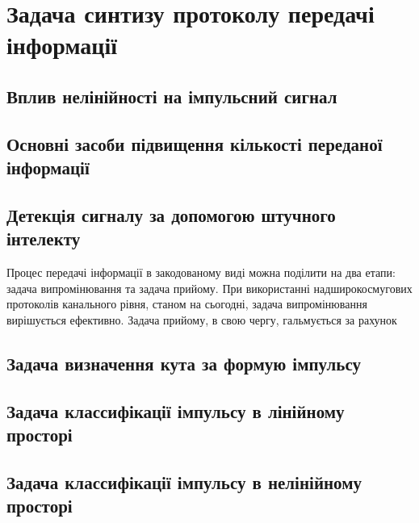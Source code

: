 \chapter{Задача синтизу протоколу передачі інформації}
\label{ch:neuron}

\section{Вплив нелінійності на імпульсний сигнал}

\section{Основні засоби підвищення кількості переданої інформації}

\section{Детекція сигналу за допомогою штучного інтелекту}

Процес передачі інформації в закодованому виді можна поділити на два етапи:
задача випромінювання та задача прийому. При використанні надширокосмугових 
протоколів канального рівня, станом на сьогодні, задача випромінювання вирішується 
ефективно. Задача прийому, в свою чергу, гальмується за рахунок 

\section{Задача визначення кута за формую імпульсу}

\section{Задача классифікації імпульсу в лінійному просторі}

\section{Задача классифікації імпульсу в нелінійному просторі}

